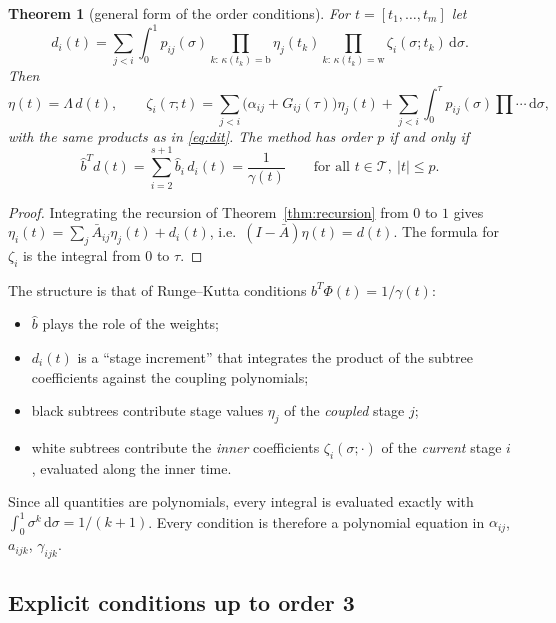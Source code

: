 \documentclass[11pt,a4paper]{article}
\newtheorem{theorem}{Theorem}[section]
\theoremstyle{definition}
\theoremstyle{remark}
\newcommand{\T}{\mathcal{T}}
\newcommand{\dd}{\,\mathrm{d}}
\begin{document}
\begin{theorem}[general form of the order conditions]\label{thm:general}
For $t=[t_1,\dots,t_m]$ let
\begin{equation}\label{eq:dit}
 d_i(t)=\sum_{j<i}\int_0^1p_{ij}(\sigma)
   \prod_{k:\,\kappa(t_k)=\mathrm b}\eta_j(t_k)
   \prod_{k:\,\kappa(t_k)=\mathrm w}\zeta_i(\sigma;t_k)\dd\sigma .
\end{equation}
Then
\begin{equation*}
 \eta(t)=\Lambda\,d(t),\qquad
 \zeta_i(\tau;t)=\sum_{j<i}\big(\alpha_{ij}+G_{ij}(\tau)\big)\eta_j(t)
   +\sum_{j<i}\int_0^\tau p_{ij}(\sigma)\prod\cdots\dd\sigma,
\end{equation*}
with the same products as in \eqref{eq:dit}. The method has order $p$ if
and only if
\begin{equation}\label{eq:oc}
 \hat b^Td(t)=\sum_{i=2}^{s+1}\hat b_i\,d_i(t)=\frac1{\gamma(t)}
 \qquad\text{for all }t\in\T,\ |t|\le p .
\end{equation}
\end{theorem}

\begin{proof}
Integrating the recursion of Theorem~\ref{thm:recursion} from $0$ to $1$
gives $\eta_i(t)=\sum_j\bar A_{ij}\eta_j(t)+d_i(t)$, i.e.\
$(I-\bar A)\eta(t)=d(t)$. The formula for $\zeta_i$ is the integral from
$0$ to $\tau$.
\end{proof}

The structure is that of Runge--Kutta conditions $b^T\Phi(t)=1/\gamma(t)$:
\begin{itemize}
\item $\hat b$ plays the role of the weights;
\item $d_i(t)$ is a ``stage increment'' that integrates the product of
  the subtree coefficients against the coupling polynomials;
\item black subtrees contribute stage values $\eta_j$ of the
  \emph{coupled} stage $j$;
\item white subtrees contribute the \emph{inner} coefficients
  $\zeta_i(\sigma;\cdot)$ of the \emph{current} stage $i$, evaluated
  along the inner time.
\end{itemize}
Since all quantities are polynomials, every integral is evaluated
exactly with $\int_0^1\sigma^k\dd\sigma=1/(k+1)$. Every condition is
therefore a polynomial equation in $\alpha_{ij}$, $a_{ijk}$,
$\gamma_{ijk}$.

\subsection{Explicit conditions up to order 3}
\end{document}
